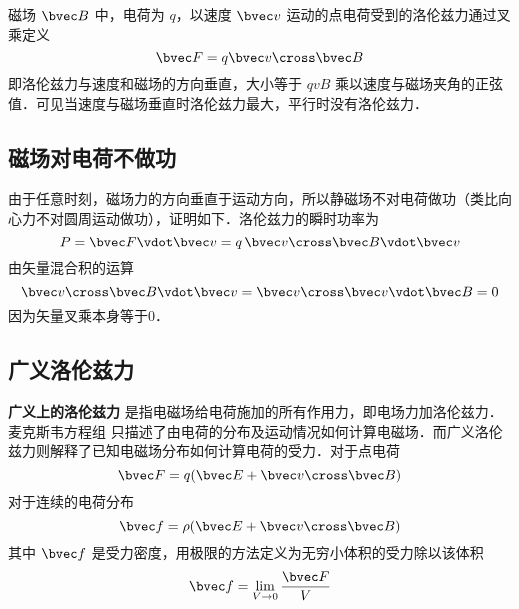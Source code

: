 
磁场 $\bvec B$ 中，电荷为 $q$，以速度 $\bvec v$ 运动的点电荷受到的洛伦兹力通过叉乘定义
\begin{equation}\label{Lorenz_eq1}
\bvec F = q\bvec v \cross \bvec B
\end{equation}
即洛伦兹力与速度和磁场的方向垂直，大小等于 $qvB$ 乘以速度与磁场夹角的正弦值．可见当速度与磁场垂直时洛伦兹力最大，平行时没有洛伦兹力．

\subsection{磁场对电荷不做功}
由于任意时刻，磁场力的方向垂直于运动方向，所以静磁场不对电荷做功（类比向心力不对圆周运动做功），证明如下．洛伦兹力的瞬时功率为
\begin{equation}
P = \bvec F \vdot \bvec v = q\,\bvec v \cross \bvec B \vdot \bvec v
\end{equation}
由矢量混合积的运算 %
\begin{equation}
\bvec v \cross \bvec B \vdot \bvec v = \bvec v \cross \bvec v \vdot \bvec B = 0
\end{equation}
因为矢量叉乘本身等于0．


\subsection{广义洛伦兹力}
\textbf{广义上的洛伦兹力} 是指电磁场给电荷施加的所有作用力，即电场力加洛伦兹力．麦克斯韦方程组%
只描述了由电荷的分布及运动情况如何计算电磁场．而广义洛伦兹力则解释了已知电磁场分布如何计算电荷的受力．对于点电荷
\begin{equation}
\bvec F = q (\bvec E + \bvec v \cross \bvec B)
\end{equation}
对于连续的电荷分布
\begin{equation}
\bvec f = \rho(\bvec E + \bvec v \cross \bvec B)
\end{equation}
其中 $\bvec f$ 是受力密度，用极限的方法定义为无穷小体积的受力除以该体积
\begin{equation}
\bvec f = \lim_{V \to 0} \frac{\bvec F}{V}
\end{equation}

